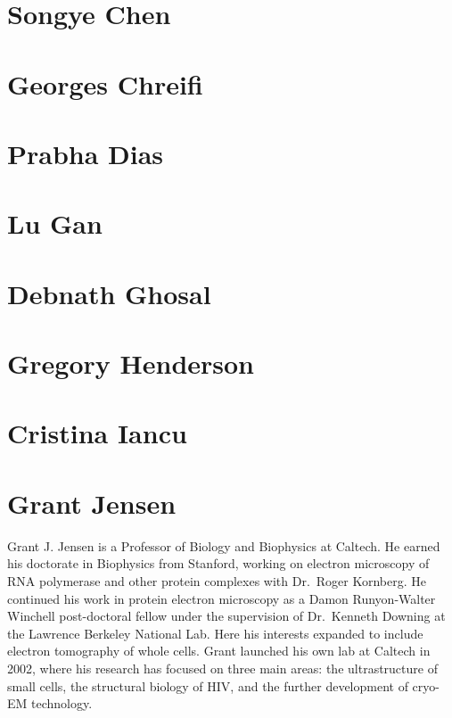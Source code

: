 \documentclass[]{tufte-book}
\begin{document}
\hypertarget{songye_chen}{\section{Songye Chen}\label{songye_chen}}

\hypertarget{georges_chreifi}{\section{Georges
Chreifi}\label{georges_chreifi}}

\hypertarget{prabha_dias}{\section{Prabha Dias}\label{prabha_dias}}

\hypertarget{lu_gan}{\section{Lu Gan}\label{lu_gan}}

\hypertarget{debnath_ghosal}{\section{Debnath
Ghosal}\label{debnath_ghosal}}

\hypertarget{gregory_henderson}{\section{Gregory
Henderson}\label{gregory_henderson}}

\hypertarget{cristina_iancu}{\section{Cristina
Iancu}\label{cristina_iancu}}

\section{Grant Jensen}\label{grant_jensen}

Grant J. Jensen is a Professor of Biology and Biophysics at Caltech. He
earned his doctorate in Biophysics from Stanford, working on electron
microscopy of RNA polymerase and other protein complexes with Dr.~Roger
Kornberg. He continued his work in protein electron microscopy as a
Damon Runyon-Walter Winchell post-doctoral fellow under the supervision
of Dr.~Kenneth Downing at the Lawrence Berkeley National Lab. Here his
interests expanded to include electron tomography of whole cells. Grant
launched his own lab at Caltech in 2002, where his research has focused
on three main areas: the ultrastructure of small cells, the structural
biology of HIV, and the further development of cryo-EM technology.
\end{document}
